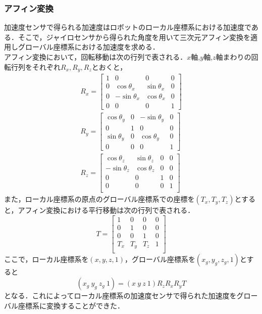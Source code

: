 \documentclass[11pt,a4]{jsarticle}
\begin{document}
 \subsubsection{アフィン変換}
   加速度センサで得られる加速度はロボットのローカル座標系における加速度である．そこで，ジャイロセンサから得られた角度を用いて三次元アフィン変換を適用しグローバル座標系における加速度を求める．\\
   アフィン変換において，回転移動は次の行列で表される．$x$軸,$y$軸,$z$軸まわりの回転行列をそれぞれ$R_x, R_y, R_z$とおくと，
   \begin{eqnarray}
    R_x = \left[
	   \begin{array}{cccc}
	    1 &        0      &       0       & 0 \\
	    0 & \cos \theta_x & \sin \theta_x & 0 \\
	    0 & -\sin \theta_x& \cos \theta_x & 0 \\
	    0 &        0      &       0       & 1
	   \end{array}
	  \right] \\
    R_y = \left[
	   \begin{array}{cccc}
	    \cos \theta_y & 0 & -\sin \theta_y & 0 \\
	          0       & 1 &       0        & 0 \\
	    \sin \theta_y & 0 &  \cos \theta_y & 0 \\
	          0       & 0 &       0        & 1
	   \end{array}
	  \right] \\
    R_z = \left[
	    \begin{array}{cccc}
	     \cos \theta_z & \sin \theta_z & 0 & 0 \\
	    -\sin \theta_z & \cos \theta_z & 0 & 0 \\
		   0	   &	   0	   & 1 & 0 \\
	           0       &       0       & 0 & 1 \\
	    \end{array}
	   \right]
   \end{eqnarray}
   また，ローカル座標系の原点のグローバル座標系での座標を$(T_x,T_y,T_z)$とすると，アフィン変換における平行移動は次の行列で表される．
   \begin{equation}
    T = \left[
	    \begin{array}{cccc}
	      1  &  0  &  0  & 0 \\
	      0  &  1  &  0  & 0 \\
	      0  &  0  &  1  & 0 \\
             T_x & T_y & T_z & 1 \\
	    \end{array}
	   \right]
   \end{equation}
   ここで，ローカル座標系を$(x,y,z,1)$，グローバル座標系を$(x_g,y_g,z_g,1)$とすると
   \begin{equation}
    (x_g \  y_g \ z_g \ 1) = (x \ y \ z \ 1) R_z  R_x  R_y T
   \end{equation}
   となる．これによってローカル座標系の加速度センサで得られた加速度をグローバル座標系に変換することができた．
\end{document}
